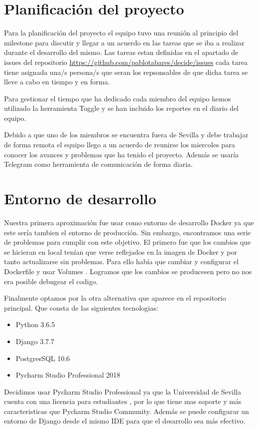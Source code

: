 \documentclass[12pt]{article}
\begin{document}
\section{Planificación del proyecto}
Para la planificación del proyecto el equipo tuvo una reunión al principio del milestone para discutir y llegar a un acuerdo en las tareas que se iba a realizar durante el desarrollo del mismo. Las tareas estan definidas en el apartado de issues del repositorio \url{https://github.com/pablotabares/decide/issues} cada tarea tiene asignada una/s persona/s que seran los repsonsables de que dicha tarea se lleve a cabo en tiempo y en forma. 

Para gestionar el tiempo que ha dedicado cada miembro del equipo hemos utilizado la herramienta Toggle \cite{toggl} y se han incluido los reportes en el diario del equipo. 

Debido a que uno de los miembros se encuentra fuera de Sevilla y debe trabajar de forma remota el equipo llego a un acuerdo de reunirse los miercoles para conocer los avances y problemas que ha tenido el proyecto. Además se usaría Telegram \cite{telegram} como herramienta de comunicación de forma diaria.

\section{Entorno de desarrollo}
Nuestra primera aproximación fue usar como entorno de desarrollo Docker ya que este sería tambien el entorno de producción. Sin embargo, encontramos una serie de problemas para cumplir con este objetivo. El primero fue que los cambios que se hicieran en local tenían que verse reflejados en la imagen de Docker y por tanto actualizarse sin problemas. Para ello había que cambiar y configurar el Dockerfile y usar Volumes \cite{update-code-docker}. Logramos que los cambios se producesen pero no nos era posible debugear el codigo. 

Finalmente optamos por la otra alternativa que aparece en el repositorio principal. Que consta de las siguientes tecnologias:

\begin{itemize}
\item Python 3.6.5
\item Django 3.7.7
\item PostgresSQL 10.6
\item Pycharm Studio Professional 2018
\end{itemize}

Decidimos usar Pycharm Studio Professional ya que la Universidad de Sevilla cuenta con una licencia para estudiantes \cite{github-student}, por lo que tiene mas soporte y más caracteristicas que Pycharm Studio Community. Además se puede configurar un entorno de Django desde el mismo IDE para que el desarrollo sea más efectivo.
\end{document}
